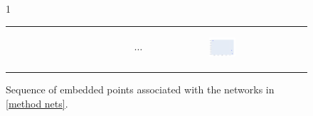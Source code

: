 \documentclass[12pt]{amsbook}
\begin{document}
\begin{figure}[c]{1\textwidth}
\begin{tabular}{llll}
\begin{subfigure}[c]{0.31\textwidth}
\begin{subfigure}[p]{1\textwidth}
            \end{subfigure}
        \end{subfigure}
        &
        $\cdots$
        &
        \centering
        \begin{subfigure}[c]{0.31\textwidth}
            \centering
            \begin{subfigure}[p]{1\textwidth}
                \includegraphics[width=\linewidth]{../Code/Plots/examples/plot 3.png}
               
            \end{subfigure}
        \end{subfigure}
        
        \end{tabular}
        \caption{Sequence of embedded points associated with the networks in \cref{method nets}.}
        \label{method plots}
        
    \end{figure}
\end{document}
